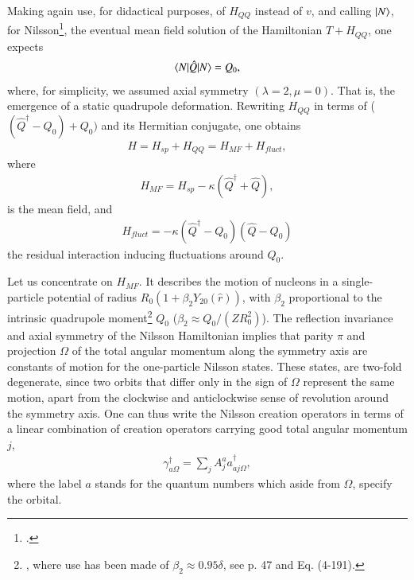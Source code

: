 Making again use, for didactical purposes, of $H_{QQ}$ instead of $v$, and calling $|{N} \rangle$, for Nilsson\footnote{\cite{Nilsson:55}.}, the eventual mean field solution of the Hamiltonian $T+H_{QQ}$, one expects
  \begin{align}\label{eq0.4.1}
\langle {N|\hat Q|N} \rangle=Q_0,
  \end{align}
where, for simplicity, we assumed axial symmetry $(\lambda=2,\mu=0)$. That is, the emergence of a static quadrupole deformation.
Rewriting $H_{QQ}$ in terms of ($(\hat Q^\dagger-Q_0)+Q_0)$ and its Hermitian conjugate, one obtains 
  \begin{align}\label{eq0.4.2}
H=H_{sp}+H_{QQ}=H_{MF}+H_{fluct},
\end{align}
where 
  \begin{align}\label{eq0.4.3}
H_{MF}=H_{sp}-\kappa(\hat Q^\dagger+\hat Q),
\end{align}
is the mean field, and
\begin{align}\label{eq0.4.4}
H_{fluct}=-\kappa(\hat Q^\dagger-Q_0)(\hat Q-Q_0)
\end{align}
the residual interaction inducing fluctuations around $Q_0$.


 Let us  concentrate on $H_{MF}$. It describes the motion of nucleons in a single-particle potential of radius $R_0(1+\beta_2Y_{20}(\hat r))$, with $\beta_2$ proportional to the intrinsic quadrupole moment\footnote{\cite{Mottelson:59}, where use has been made of $\beta_2\approx0.95\delta$, see \cite{Bohr:75} p. 47 and Eq. (4-191).} $Q_0$ ($\beta_2\approx Q_0/(ZR_0^2)$). The reflection invariance and axial symmetry of the Nilsson Hamiltonian implies that parity $\pi$ and projection $\Omega$ of the total angular momentum along the symmetry axis are constants of motion for the one-particle Nilsson states. These states, are two-fold degenerate, since two orbits that differ only in the sign of $\Omega$ represent the same motion, apart from the clockwise and anticlockwise sense of revolution around the symmetry axis. One can thus write the Nilsson creation operators in terms of a linear combination of creation operators carrying good total angular momentum $j$, 
\begin{align}\label{eq0.4.5}
\gamma^\dagger_{a\Omega}=\sum_jA_j^aa^\dagger_{aj\Omega},
\end{align}
where the label $a$ stands for  the quantum numbers which aside from $\Omega$, specify the orbital. 

